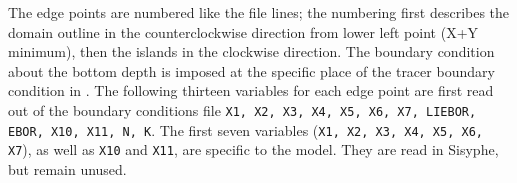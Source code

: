 The edge points are numbered like the file lines; the numbering first
describes the domain outline in the counterclockwise direction from lower
left point (X+Y minimum), then the islands in the clockwise direction. The
boundary condition about the bottom depth is imposed at the specific place
of the tracer boundary condition in \teldd.
The following thirteen variables for each edge point are first read out of
the boundary conditions file \texttt{X1, X2, X3, X4, X5, X6, X7, LIEBOR, EBOR, X10,
X11, N, K}. The first seven variables (\texttt{X1, X2, X3, X4, X5, X6, X7}), as well as \texttt{X10} and
\texttt{X11}, are specific to the \teldd model. They are read in Sisyphe, but
remain unused.

